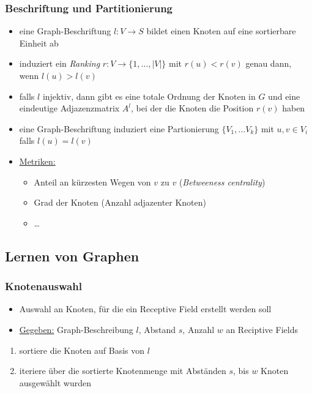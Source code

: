 \subsubsection{Beschriftung und Partitionierung}

\begin{itemize}
  \item eine Graph-Beschriftung $l: V \rightarrow S$ bildet einen Knoten auf eine sortierbare Einheit ab
  \item induziert ein \emph{Ranking} $r: V \rightarrow \lbrace 1, \ldots, |V| \rbrace$ mit $r(u) < r(v)$ genau dann, wenn $l(u) > l(v)$
  \item falls $l$ injektiv, dann gibt es eine totale Ordnung der Knoten in $G$ und eine eindeutige Adjazenzmatrix $A^l$, bei der die Knoten die Position $r(v)$ haben
  \item eine Graph-Beschriftung induziert eine Partionierung $\lbrace V_1, \ldots V_k \rbrace$ mit $u, v \in V_i$ falls $l(u) = l(v)$
  \item \underline{Metriken:}
    \begin{itemize}
      \item Anteil an kürzesten Wegen von $v$ zu $v$ (\emph{Betweeness centrality})
      \item Grad der Knoten (Anzahl adjazenter Knoten)
      \item \ldots
    \end{itemize}
\end{itemize}

\subsection{Lernen von Graphen}

\subsubsection{Knotenauswahl}

\begin{itemize}
  \item Auswahl an Knoten, für die ein Receptive Field erstellt werden soll
  \item \underline{Gegeben:} Graph-Beschreibung $l$, Abstand $s$, Anzahl $w$ an Reciptive Fields
\end{itemize}

\begin{enumerate}
  \item sortiere die Knoten auf Basis von $l$
  \item iteriere über die sortierte Knotenmenge mit Abständen $s$, bis $w$ Knoten ausgewählt wurden
\end{enumerate}


